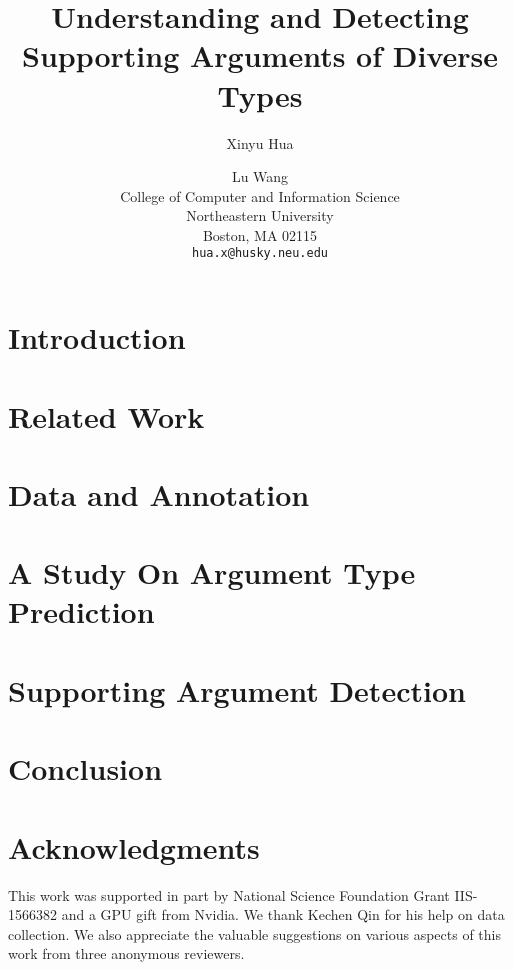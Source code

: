 \documentclass[11pt,a4paper]{article}
\title{Understanding and Detecting Supporting Arguments of Diverse Types}
\author{Xinyu Hua \and Lu Wang \\ College of Computer and Information Science \\ Northeastern University \\ Boston, MA 02115 \\ {\tt hua.x@husky.neu.edu} \quad {\tt luwang@ccs.neu.edu}}
\begin{document}
\maketitle




\section{Introduction}


\section{Related Work}
\label{sec:related}


\section{Data and Annotation}
\label{sec:data}


\section{A Study On Argument Type Prediction}
\label{sec:type}


\section{Supporting Argument Detection}
\label{sec:relevance}


\section{Conclusion}
\label{sec:conclusion}


\section*{Acknowledgments}
This work was supported in part by National Science Foundation Grant IIS-1566382 and a GPU gift from Nvidia. We thank Kechen Qin for his help on data collection. We also appreciate the valuable suggestions on various aspects of this work from three anonymous reviewers.

\newpage



\end{document}
